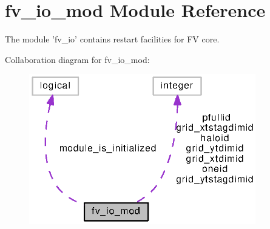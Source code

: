 \section{fv\-\_\-io\-\_\-mod Module Reference}
\label{classfv__io__mod}


The module 'fv\-\_\-io' contains restart facilities for F\-V core.  




Collaboration diagram for fv\-\_\-io\-\_\-mod\-:
\nopagebreak
\begin{figure}[H]
\begin{center}
\leavevmode
\includegraphics[width=280pt]{classfv__io__mod__coll__graph}
\end{center}
\end{figure}
